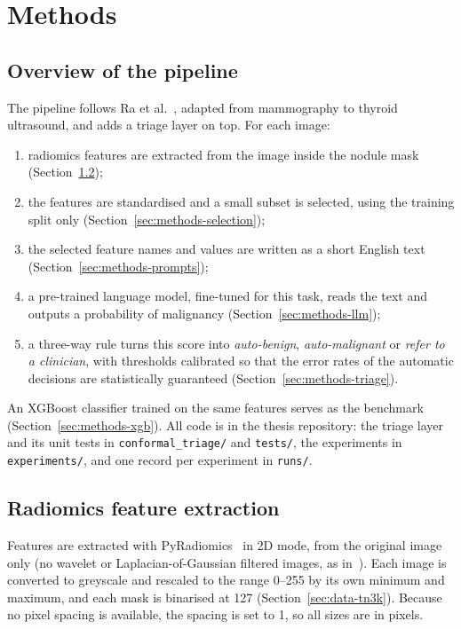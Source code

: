 \chapter{Methods}
\label{ch:methods}

\section{Overview of the pipeline}
\label{sec:methods-overview}

The pipeline follows Ra et al.~\citep{ra2025}, adapted from mammography to thyroid ultrasound,
and adds a triage layer on top. For each image:

\begin{enumerate}
  \item radiomics features are extracted from the image inside the nodule mask
        (Section~\ref{sec:methods-extraction});
  \item the features are standardised and a small subset is selected, using the training split
        only (Section~\ref{sec:methods-selection});
  \item the selected feature names and values are written as a short English text
        (Section~\ref{sec:methods-prompts});
  \item a pre-trained language model, fine-tuned for this task, reads the text and outputs a
        probability of malignancy (Section~\ref{sec:methods-llm});
  \item a three-way rule turns this score into \emph{auto-benign}, \emph{auto-malignant} or
        \emph{refer to a clinician}, with thresholds calibrated so that the error rates of the
        automatic decisions are statistically guaranteed (Section~\ref{sec:methods-triage}).
\end{enumerate}

An XGBoost classifier trained on the same features serves as the benchmark
(Section~\ref{sec:methods-xgb}). All code is in the thesis repository: the triage layer and
its unit tests in \texttt{conformal\_triage/} and \texttt{tests/}, the experiments in
\texttt{experiments/}, and one record per experiment in \texttt{runs/}.

\section{Radiomics feature extraction}
\label{sec:methods-extraction}

Features are extracted with PyRadiomics~\citep{vangriethuysen2017} in 2D mode, from the original
image only (no wavelet or Laplacian-of-Gaussian filtered images, as in~\citep{ra2025}). Each image
is converted to greyscale and rescaled to the range 0--255 by its own minimum and maximum, and
each mask is binarised at 127 (Section~\ref{sec:data-tn3k}). Because no pixel spacing is
available, the spacing is set to 1, so all sizes are in pixels.

